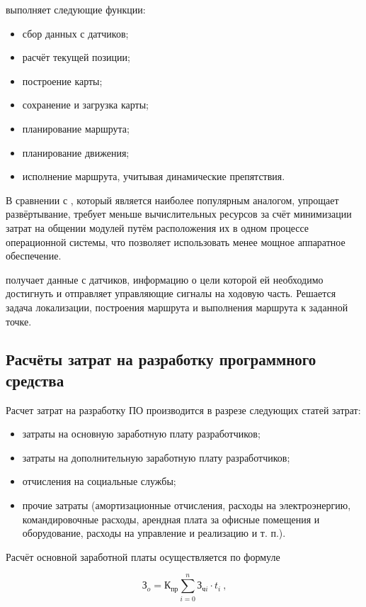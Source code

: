 \appname{} выполняет следующие функции:

\begin{itemize}
	\item сбор данных с датчиков;
	\item расчёт текущей позиции;
	\item построение карты;
	\item сохранение и загрузка карты;
	\item планирование маршрута;
	\item планирование движения;
	\item исполнение маршрута, учитывая динамические препятствия.
\end{itemize}


В сравнении с \ros{}, который является наиболее популярным аналогом, \appname{}
упрощает развёртывание, требует меньше вычислительных ресурсов за счёт
минимизации затрат на общении модулей путём расположения их в одном процессе
операционной системы, что позволяет использовать менее мощное аппаратное
обеспечение.

\appname{} получает данные с датчиков, информацию о цели которой ей 
необходимо достигнуть  и отправляет управляющие сигналы на ходовую часть. 
Решается задача локализации, построения маршрута и выполнения маршрута 
к заданной точке. 

\subsection{Расчёты затрат на разработку программного средства}

Расчет затрат на разработку ПО производится в разрезе следующих статей затрат:

\begin{itemize}
	\item затраты на основную заработную плату разработчиков;
	\item затраты на дополнительную заработную плату разработчиков;
	\item отчисления на социальные службы;
	\item прочие затраты (амортизационные отчисления, расходы на 
		электроэнергию, командировочные расходы, арендная плата за офисные
		помещения и оборудование, расходы на управление и реализацию и т. п.).
\end{itemize}

Расчёт основной заработной платы осуществляется по формуле

\begin{equation}
	\label{eq:зарплата}
	\text{З}_o = \text{К}_{\text{пр}}\sum_{i=0}^{n} \text{З}_{\text{ч}i} \cdot t_i
	\ \text{,}
\end{equation}


